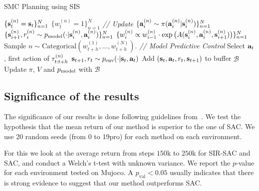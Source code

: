 \begin{algorithm}[H]
\caption{SMC Planning using SIS}
\label{alg:sis_planning}
\begin{algorithmic}[1]
\STATE $\{ {\mathbf{s}}^{(n)}_t = {\mathbf{s}}_t\}_{n=1}^N$
\STATE  $\{w^{(n)}_t =1\}_{n=1}^N$
\STATE \textit{// Update}
\STATE $\{{\mathbf{a}}^{(n)}_{i} \sim \pi({\mathbf{a}}^{(n)}_{i}|{\mathbf{s}}^{(n)}_{i})\}_{n=1}^N$
\STATE $\{{\mathbf{s}}^{(n)}_{i+1}, r^{(n)}_{i} \sim p_{\rm{model}}(\cdot | {\mathbf{s}}^{(n)}_{i}, {\mathbf{a}}^{(n)}_{i})\}_{n=1}^N$
\STATE $\{w_i^{(n)} \propto w^{(n)}_{i-1} \cdot \exp \big( A({\mathbf{s}}^{(n)}_{i}, {\mathbf{a}}^{(n)}_{i}, {\mathbf{s}}^{(n)}_{i+1}) \big) \}_{n=1}^N$
\ENDFOR
\STATE Sample $n \sim \text{Categorical}(w_{t+h}^{(1)}, \ldots, w_{t+h}^{(N)})$.
\STATE \textit{// Model Predictive Control}
\STATE Select ${\mathbf{a}}_t$, first action of $\tau^{(n)}_{t:t+h}$
\STATE ${\mathbf{s}}_{t+1}, r_t \sim p_{\text{env}}(\cdot|{\mathbf{s}}_t, {\mathbf{a}}_t)$
\STATE Add $({\mathbf{s}}_t, {\mathbf{a}}_t, r_t, {\mathbf{s}}_{t+1})$ to buffer $\mathcal{B}$
\STATE Update $\pi$, $V$ and $p_{\rm{model}}$ with $\mathcal{B}$
\ENDFOR
\end{algorithmic}
\end{algorithm}

\subsection{Significance of the results}
\label{sec:significance}
The significance of our results is done following guidelines from~\citet{colas2018many}. We test the hypothesis that the mean return of our method is superior to the one of SAC. We use 20 random seeds (from 0 to 19pro) for each method on each environment.

For this we look at the average return from steps $150$k to $250$k for SIR-SAC and SAC, and conduct a Welch's t-test with unknown variance. We report the $p$-value for each environment tested on Mujoco. A 
$p_{\text{val}} < 0.05$ usually indicates that there is strong evidence to suggest that our method outperforms SAC.

